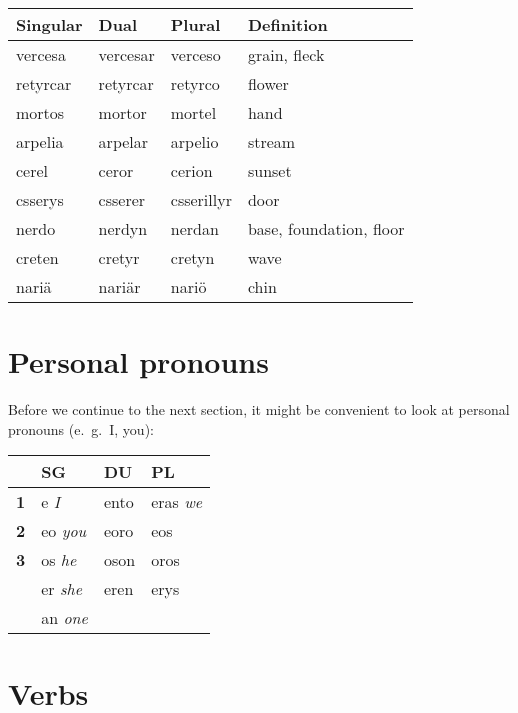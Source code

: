 \begin{center}
  \begin{tabular}{|l|l|l|l|}
    \hline
    \textbf{Singular} & \textbf{Dual} & \textbf{Plural} & \textbf{Definition} \\ \hline
    vercesa & vercesar & verceso & grain, fleck \\ \hline
    retyrcar & retyrcar & retyrco & flower \\ \hline
    mortos & mortor & mortel & hand \\ \hline
    arpelia & arpelar & arpelio & stream \\ \hline
    cerel & ceror & cerion & sunset \\ \hline
    csserys & csserer & csserillyr & door \\ \hline
    nerdo & nerdyn & nerdan & base, foundation, floor \\ \hline
    creten & cretyr & cretyn & wave \\ \hline
    nari\"a & nari\"ar & nari\"o & chin \\ \hline
  \end{tabular}
\end{center}

\section{Personal pronouns}

Before we continue to the next section, it might be convenient to look at personal pronouns (e.~g.~I, you):

\begin{center}
  \begin{tabular}{|r|l|l|l|}
    \hline
    & \textbf{SG} & \textbf{DU} & \textbf{PL} \\ \hline
    \textbf{1} & e \emph{I} & ento & eras \emph{we} \\ \hline
    \textbf{2} & eo \emph{you} & eoro & eos \\ \hline
    \textbf{3} & os \emph{he} & oson & oros \\
    & er \emph{she} & eren & erys \\
    & an \emph{one} & & \\ \hline
  \end{tabular}
\end{center}

\section{Verbs}

